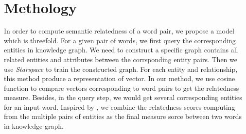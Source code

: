 \section{Methology}
In order to compute semantic relatedness of a word pair, we propose a model which is
threefold. 
For a given pair of words, we first query the corresponding entities in knowledge graph.
We need to construct a specific graph contains all related entities and attributes between the 
corrsponding entity pairs. Then we use \emph{Starspace} to train the constructed 
graph. For each entity and relationship, this method produce a representation of vector.
In our method, we use cosine function to compare vectors corresponding to word pairs to get the relatedness measure.
Besides, in the query step, we would get several corresponding entities for an input word. Inspired by
\cite{acl/IacobacciPN15}, we combine the relatedness scores computing from the multiple pairs of entities 
as the final measure sorce between two words in knowledge graph.

\begin{table*}[]
    \small
    \centering
    \caption{Query Entity}
    \label{entities}
    \renewcommand\arraystretch{1.6}
\end{table*}


